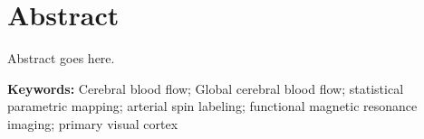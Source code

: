 \section{Abstract}
Abstract goes here.

\textbf{Keywords:} Cerebral blood flow; Global cerebral blood flow; statistical parametric mapping; arterial spin labeling; functional magnetic resonance imaging; primary visual cortex
